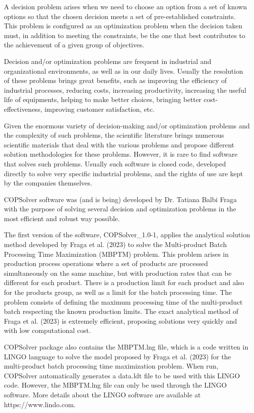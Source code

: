\documentclass[11pt, letterpaper]{article}
\begin{document}
A decision problem arises when we need to choose an option from a set of known options so that the chosen decision meets a set of pre-established constraints. This problem is configured as an optimization problem when the decision taken must, in addition to meeting the constraints, be the one that best contributes to the achievement of a given group of objectives.

Decision and/or optimization problems are frequent in industrial and organizational environments, as well as in our daily lives. Usually the resolution of these problems brings great benefits, such as improving the efficiency of industrial processes, reducing costs, increasing productivity, increasing the useful life of equipments, helping to make better choices, bringing better cost-effectiveness, improving customer satisfaction, etc.

Given the enormous variety of decision-making and/or optimization problems and the complexity of such problems, the scientific literature brings numerous scientific materials that deal with the various problems and propose different solution methodologies for these problems. However, it is rare to find software that solves such problems. Usually such software is closed code, developed directly to solve very specific industrial problems, and the rights of use are kept by the companies themselves. 

COPSolver software was (and is being) developed by Dr. Tatiana Balbi Fraga with the purpose of solving several decision and optimization problems in the most efficient and robust way possible.

The first version of the software, COPSolver\_1.0-1, applies the analytical solution method developed by Fraga et al. (2023) to solve the Multi-product Batch Processing Time Maximization (MBPTM) problem. This problem arises in production process operations where a set of products are processed simultaneously on the same machine, but with production rates that can be different for each product. There is a production limit for each product and also for the products group, as well as a limit for the batch processing time. The problem consists of defining the maximum processing time of the multi-product batch respecting the known production limits. The exact analytical method of Fraga et al. (2023) is extremely efficient, proposing solutions very quickly and with low computational cost. 

COPSolver package also contains the MBPTM.lng file, which is a code written in LINGO language to solve the model proposed by Fraga et al. (2023) for the multi-product batch processing time maximization problem. When run, COPSolver automatically generates a data.ldt file to be used with this LINGO code. However, the MBPTM.lng file can only be used through the LINGO software. More details about the LINGO software are available at https://www.lindo.com.
\end{document}
